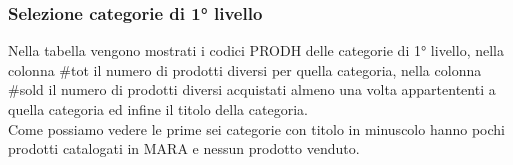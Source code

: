 \subsubsection{Selezione categorie di 1° livello}

\begin{minipage}[H]{0.4\textwidth}
\end{minipage}
\begin{minipage}[H]{0.6\textwidth}
	Nella tabella vengono mostrati i codici PRODH delle categorie di 1° livello, nella colonna \#tot il numero di prodotti diversi per quella categoria, nella colonna \#sold il numero di prodotti diversi acquistati almeno una volta appartententi a quella categoria ed infine il titolo della categoria.\\
	Come possiamo vedere le prime sei categorie con titolo in minuscolo hanno pochi prodotti catalogati in MARA e nessun prodotto venduto.\\
\end{minipage}
